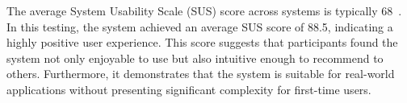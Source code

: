 The average System Usability Scale (SUS) score across systems is typically 68~\cite{babich_sus_usability_website}. In this testing, the system achieved an average SUS score of 88.5, indicating a highly positive user experience. This score suggests that participants found the system not only enjoyable to use but also intuitive enough to recommend to others. Furthermore, it demonstrates that the system is suitable for real-world applications without presenting significant complexity for first-time users.




